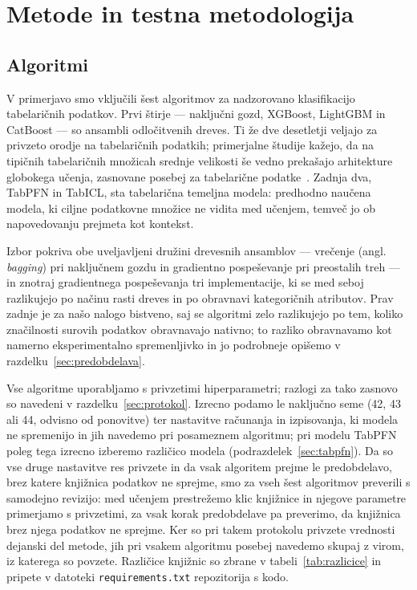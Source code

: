 \documentclass[a4paper,12pt,openright]{book}
\begin{document}
\chapter{Metode in testna metodologija}
\label{ch:metode}

\section{Algoritmi}
\label{sec:algoritmi}

V primerjavo smo vključili šest algoritmov za nadzorovano klasifikacijo
tabelaričnih podatkov. Prvi štirje --- naključni gozd, XGBoost, LightGBM in
CatBoost --- so ansambli odločitvenih dreves. Ti že dve desetletji veljajo za privzeto orodje na tabelaričnih
podatkih; primerjalne študije kažejo, da na tipičnih tabelaričnih množicah
srednje velikosti še vedno prekašajo arhitekture globokega učenja, zasnovane
posebej za tabelarične podatke~\cite{grinsztajn2022why}. Zadnja dva, TabPFN in
TabICL, sta tabelarična temeljna modela: predhodno naučena modela, ki ciljne podatkovne množice ne vidita med
učenjem, temveč jo ob napovedovanju prejmeta kot kontekst.

Izbor pokriva obe uveljavljeni družini drevesnih ansamblov --- vrečenje
(angl. \emph{bagging}) pri naključnem gozdu in gradientno pospeševanje
pri preostalih treh --- in znotraj
gradientnega pospeševanja tri implementacije, ki se med seboj razlikujejo po
načinu rasti dreves in po obravnavi kategoričnih atributov. Prav zadnje je za
našo nalogo bistveno, saj se algoritmi zelo razlikujejo po tem, koliko
značilnosti surovih podatkov obravnavajo nativno; to razliko obravnavamo kot
namerno eksperimentalno spremenljivko in jo podrobneje opišemo v
razdelku~\ref{sec:predobdelava}.

Vse algoritme uporabljamo s privzetimi hiperparametri; razlogi za tako zasnovo
so navedeni v razdelku~\ref{sec:protokol}. Izrecno podamo le naključno seme
(42, 43 ali 44, odvisno od ponovitve) ter nastavitve
računanja in izpisovanja, ki modela ne spremenijo in jih navedemo pri
posameznem algoritmu; pri modelu TabPFN poleg tega izrecno izberemo različico
modela (podrazdelek~\ref{sec:tabpfn}). Da so vse druge nastavitve res privzete
in da vsak algoritem prejme le predobdelavo, brez katere knjižnica podatkov ne
sprejme, smo za vseh šest algoritmov preverili s samodejno revizijo: med
učenjem prestrežemo klic knjižnice in njegove parametre primerjamo s
privzetimi, za vsak korak predobdelave pa preverimo, da knjižnica brez njega
podatkov ne sprejme.
Ker so pri takem
protokolu privzete vrednosti dejanski del metode, jih pri vsakem algoritmu
posebej navedemo skupaj z virom, iz katerega so povzete. Različice knjižnic so
zbrane v tabeli~\ref{tab:razlicice} in pripete v datoteki
\texttt{requirements.txt} repozitorija s kodo.
\end{document}
